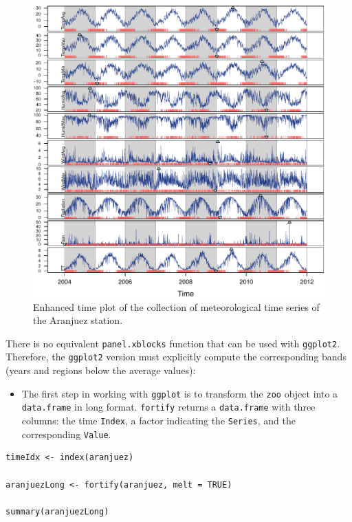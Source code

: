 \begin{figure}[htbp]
\centering
\includegraphics[width=.9\linewidth]{figs/aranjuezXblocks.pdf}
\caption{Enhanced time plot of the collection of meteorological time series of the Aranjuez station. \label{fig:aranjuezEnhanced}}
\end{figure}

There is no equivalent \texttt{panel.xblocks} function that can be used with
\texttt{ggplot2}. Therefore, the \texttt{ggplot2} version must explicitly compute
the corresponding bands (years and regions below the average values):

\begin{itemize}
\item The first step in working with \texttt{ggplot} is to transform the \texttt{zoo}
object into a \texttt{data.frame} in long format. \texttt{fortify} returns a
\texttt{data.frame} with three columns: the time \texttt{Index}, a factor
indicating the \texttt{Series}, and the corresponding \texttt{Value}.
\end{itemize}


\lstset{language=r,label= ,caption= ,captionpos=b,numbers=none}
\begin{lstlisting}
timeIdx <- index(aranjuez)
  
aranjuezLong <- fortify(aranjuez, melt = TRUE)

summary(aranjuezLong)
\end{lstlisting}

